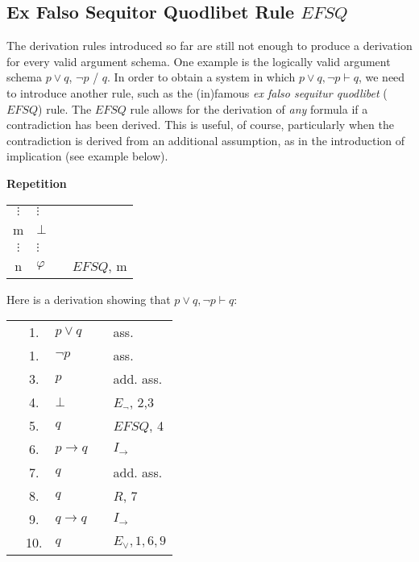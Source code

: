 \documentclass[nobib,nofonts]{tufte-handout}
\newcommand{\EFSQ}{\ensuremath{\mathit{EFSQ}}\xspace}
\begin{document}
\subsection{Ex Falso Sequitor Quodlibet Rule $\EFSQ$}

The derivation rules introduced so far are still not enough to produce a derivation for every valid argument schema.
One example is the logically valid argument schema $p \vee q$, $\neg p$ / $q$.
In order to obtain a system in which $p \vee q, \neg p \vdash q$, we need to introduce another rule, such as the (in)famous \emph{ex falso sequitur quodlibet} (\EFSQ) rule.
The \EFSQ rule allows for the derivation of \emph{any} formula if a contradiction has been derived.
This is useful, of course, particularly when the contradiction is derived from an additional assumption, as in the introduction of implication (see example below).

\bigskip
\noindent \colorbox{mygray!60}{\centering
  \begin{minipage}[t]{0.35\linewidth}
    \textbf{Repetition}
  \end{minipage}
  \begin{minipage}[t]{0.55\linewidth}
    \begin{tabular}{clcl}
            $\vdots$ & $\vdots$  & \\
      m              & $\bot$ &  \\
            $\vdots$ & $\vdots$  & \\
      n              & $\varphi$    & & $\EFSQ$, m
    \end{tabular}
  \end{minipage}
}
\bigskip

Here is a derivation showing that $p \vee q, \neg p \vdash q$:

\begin{tabular}{cclcl}
                     & 1. & $p \vee   q$                        & & ass.  \\
                     & 1. & $\neg p$                            & & ass.  \\
  \cline{1-2} \vline & 3. & $p$                                 & & add. ass.  \\
  \vline             & 4. & $\bot$                              & & $E_{\neg}$, 2,3 \\
  \vline             & 5. & $q$                                 & & $\EFSQ$, 4\\ \hline
                     & 6. & $p \rightarrow q $ & & $I_{\rightarrow}$ \\
  \cline{1-2} \vline & 7. & $q$                                 & & add. ass.  \\
  \vline             & 8. & $q$                                 & & $R$, 7\\ \hline
                     & 9. & $q \rightarrow q $ & & $I_{\rightarrow}$ \\
                     & 10. & $q$ & & $E_{\vee}, 1,6,9$ \\
\end{tabular}
\end{document}
